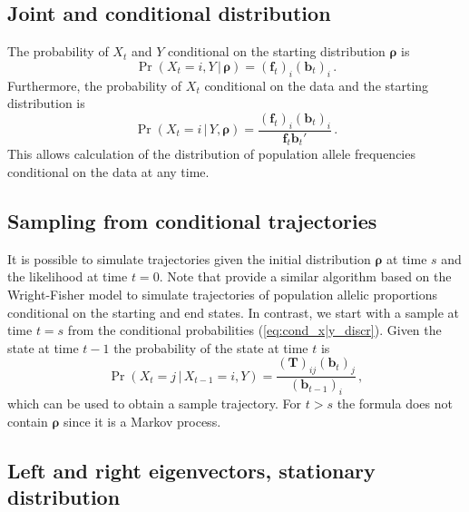 \documentclass[preprint]{elsarticle}
\newcommand{\bs}[1]{\ensuremath{\boldsymbol{#1}}}
\newcommand\given{{\,|\,}}
\newcommand\x[1]{\ensuremath{X_{#1}}}
\newcommand\y{\ensuremath{Y}}
\newcommand\s{\ensuremath{s}}
\newcommand\fv[1]{\ensuremath{\mathbf{f}_{#1}}}
\newcommand\bv[1]{\ensuremath{\mathbf{b}_{#1}}}
\begin{document}
\subsection{Joint and conditional distribution}

The probability of $\x{t}$ and $\y$ conditional on the starting distribution $\bs{\rho}$ is \begin{equation}\label{eq:joint_xy_discr}
\Pr(\x{t}=i,\y \given \bs{\rho}) = (\fv{t})_i (\bv{t})_i\,.
\end{equation}
Furthermore, the probability of $\x{t}$ conditional on the data and the starting distribution is
\begin{equation}\label{eq:cond_x|y_discr}
\Pr(\x{t}=i \given \y,\bs{\rho}) = \frac{(\fv{t})_i (\bv{t})_i}{\fv{t}\bv{t}'}\,.
\end{equation}
This allows calculation of the distribution of population allele frequencies conditional on the data at any time. 

\subsection{Sampling from conditional trajectories}

It is possible to simulate trajectories given the initial distribution $\bs{\rho}$ at time $\s$ and the likelihood at time $t=0$. Note that \citet{Zhao14} provide a similar algorithm based on the Wright-Fisher model to simulate trajectories of population allelic proportions conditional on the starting and end states. In contrast, we start with a sample at time $t=\s$ from the conditional probabilities (\ref{eq:cond_x|y_discr}). Given the state at time $t-1$ the probability of the state at time $t$ is
\begin{equation}
    \Pr(\x{t}=j\given \x{t-1}=i,\y)=\frac{(\mathbf{T})_{ij}(\mathbf{b}_{t})_j}{(\mathbf{b}_{t-1})_i}\,,
\end{equation}
which can be used to obtain a sample trajectory. For $t>s$ the formula does not contain $\bs{\rho}$ since it is a Markov process.

\subsection{Left and right eigenvectors, stationary distribution}
\end{document}
